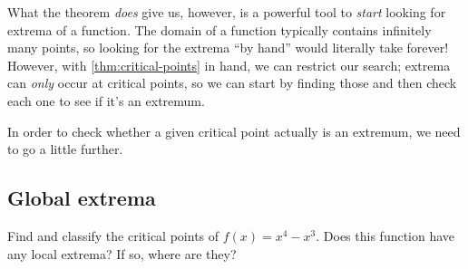 \documentclass[../book/calcnotes.tex]{subfiles}
\begin{document}
What the theorem \emph{does} give us, however, is a powerful tool to \emph{start} looking for extrema of a function.
The domain of a function typically contains infinitely many points, so looking for the extrema \enquote{by hand} would literally take forever!
However, with \cref{thm:critical-points} in hand, we can restrict our search; extrema can \emph{only} occur at critical points, so we can start by finding those and then check each one to see if it's an extremum.

In order to check whether a given critical point actually is an extremum, we need to go a little further.


\subsection{Global extrema}
\label{sec:deriv.extrema.global}

\begin{gps}
    \begin{gp}
    \label{gp:cp-not-extreme}
    Find and classify the critical points of $f(x) = x^{4} - x^{3}$.
    Does this function have any local extrema?
    If so, where are they?
  \end{gp}
\end{gps}

\begin{exercises}
\end{exercises}
\end{document}
